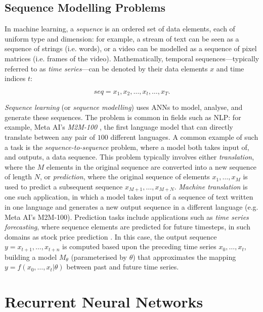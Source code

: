 \documentclass[a4paper, 11pt]{report}
\begin{document}
    \subsection{Sequence Modelling Problems}

    In machine learning, a \emph{sequence} is an ordered set of data elements, each of uniform type and dimension: for example, a stream of text can be seen as a sequence of strings (i.e. words), or a video can be modelled as a sequence of pixel matrices (i.e. frames of the video). Mathematically, temporal sequences---typically referred to as \emph{time series}---can be denoted by their data elements $x$ and time indices $t$:

    \begin{equation}
        \label{eq: timeseries}
        seq = x_1, x_2, \ldots, x_t, \ldots, x_T
        \text{.}
    \end{equation}

    \emph{Sequence learning} (or \emph{sequence modelling}) uses ANNs to model, analyse, and generate these sequences. The problem is common in fields such as NLP: for example, Meta AI's \emph{M2M-100} \citep{fan-2020}, the first language model that can directly translate between any pair of $100$ different languages. A common example of such a task is the \emph{sequence-to-sequence} problem, where a model both takes input of, and outputs, a data sequence. This problem typically involves either \emph{translation}, where the $M$ elements in the original sequence are converted into a new sequence of length $N$, or \emph{prediction}, where the original sequence of elements $x_1, \ldots, x_M$ is used to predict a subsequent sequence $x_{M+1}, \ldots, x_{M+N}$. \emph{Machine translation} is one such application, in which a model takes input of a sequence of text written in one language and generates a new output sequence in a different language (e.g. Meta AI's M2M-100). Prediction tasks include applications such as \emph{time series forecasting}, where sequence elements are predicted for future timesteps, in such domains as stock price prediction \citep{darapaneni-2022}. In this case, the output sequence $y = x_{t+1}, \ldots, x_{t+n}$ is computed based upon the preceding time series $x_0, \ldots, x_t$, building a model $M_{\theta}$ (parameterised by $\theta$) that approximates the mapping $y = f ( x_0, \ldots, x_t \lvert \theta )$ between past and future time series.


    \section{Recurrent Neural Networks}
\end{document}
